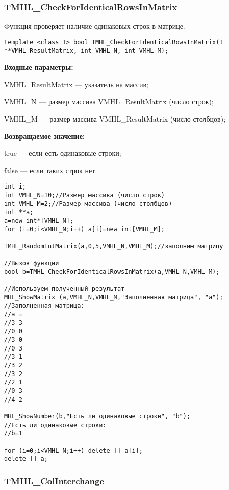 \documentclass[a4paper,12pt]{article}
\begin{document}
\subsubsection{TMHL\_CheckForIdenticalRowsInMatrix}\label{TMHL_CheckForIdenticalRowsInMatrix}

Функция проверяет наличие одинаковых строк в матрице.


\begin{lstlisting}[label=code_syntax_TMHL_CheckForIdenticalRowsInMatrix,caption=Синтаксис]
template <class T> bool TMHL_CheckForIdenticalRowsInMatrix(T **VMHL_ResultMatrix, int VMHL_N, int VMHL_M);
\end{lstlisting}

\textbf{Входные параметры:}
 
VMHL\_ResultMatrix --- указатель на массив;
 
VMHL\_N --- размер массива VMHL\_ResultMatrix (число строк);
 
VMHL\_M --- размер массива VMHL\_ResultMatrix (число столбцов);

\textbf{Возвращаемое значение:}

 true --- если есть одинаковые строки;
 
 false --- если таких строк нет.


\begin{lstlisting}[label=code_use_TMHL_CheckForIdenticalRowsInMatrix,caption=Пример использования]
int i;
int VMHL_N=10;//Размер массива (число строк)
int VMHL_M=2;//Размер массива (число столбцов)
int **a;
a=new int*[VMHL_N];
for (i=0;i<VMHL_N;i++) a[i]=new int[VMHL_M];

TMHL_RandomIntMatrix(a,0,5,VMHL_N,VMHL_M);//заполним матрицу

//Вызов функции
bool b=TMHL_CheckForIdenticalRowsInMatrix(a,VMHL_N,VMHL_M);

//Используем полученный результат
MHL_ShowMatrix (a,VMHL_N,VMHL_M,"Заполненная матрица", "a");
//Заполненная матрица:
//a =
//3	3
//0	0
//3	0
//0	3
//3	1
//3	2
//3	2
//2	1
//0	3
//4	2

MHL_ShowNumber(b,"Есть ли одинаковые строки", "b");
//Есть ли одинаковые строки:
//b=1

for (i=0;i<VMHL_N;i++) delete [] a[i];
delete [] a;
\end{lstlisting}

\subsubsection{TMHL\_ColInterchange}\label{TMHL_ColInterchange}
\end{document}
